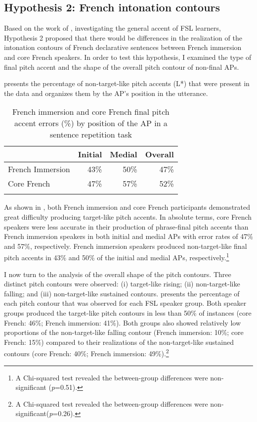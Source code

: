 \documentclass[output=paper,colorlinks,citecolor=brown,draftmode]{langscibook}
\begin{document}
\subsection{Hypothesis 2: French intonation contours}
Based on the work of \citet{Poljak:2015}, investigating the general accent of FSL learners, Hypothesis 2 proposed that there would be differences in the realization of the intonation contours of French declarative sentences between French immersion and core French speakers. In order to test this hypothesis, I examined the type of final pitch accent and the shape of the overall pitch contour of non-final APs.


 presents the percentage of non-target-like pitch accents (L*) that were present in the data and organizes them by the AP’s position in the utterance.

\begin{table}
\caption{French immersion and core French final pitch accent errors (\%) by position of the AP in a sentence repetition task}
\label{tab:1:pitch errors}
 \begin{tabular}{l rrr}
  \lsptoprule
            & Initial & Medial  & Overall\\
  \midrule
  French Immersion  &   43\%  &    50\%  &    47\%\\
  Core French  &   47\% &   57\%  &    52\%\\
  \lspbottomrule
 \end{tabular}
\end{table}

\noindent As shown in , both French immersion and core French participants demonstrated great difficulty producing target-like pitch accents. In absolute terms, core French speakers were less accurate in their production of phrase-final pitch accents than French immersion speakers in both initial and medial APs with error rates of 47\% and 57\%, respectively. French immersion speakers produced non-target-like final pitch accents in 43\% and 50\% of the initial and medial APs, respectively.\footnote{A Chi-squared test revealed the between-group differences were non-significant (\textit{p}=0.51).}


I now turn to the analysis of the overall shape of the pitch contours. Three distinct pitch contours were observed: (i) target-like rising; (ii) non-target-like falling; and (iii) non-target-like sustained contours.  presents the percentage of each pitch contour that was observed for each FSL speaker group. Both speaker groups produced the target-like pitch contours in less than 50\% of instances (core French: 46\%; French immersion: 41\%). Both groups also showed relatively low proportions of the non-target-like falling contour (French immersion: 10\%; core French: 15\%) compared to their realizations of the non-target-like sustained contours (core French: 40\%; French immersion: 49\%).\footnote{A Chi-squared test revealed the between-group differences were non-significant(\textit{p}=0.26).}
\end{document}
